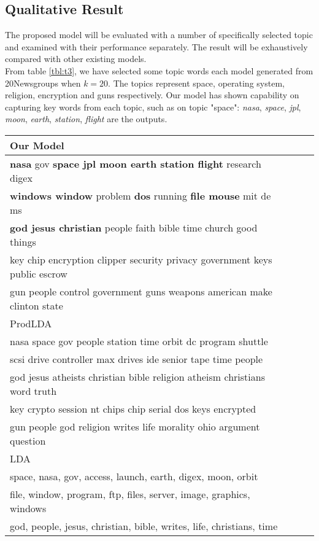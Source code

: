 \subsection{Qualitative Result}The proposed model will be evaluated with a number of specifically selected topic and examined with their performance separately. The result will be exhaustively compared with other existing models.\\
From table \ref{tbl:t3}, we have selected some topic words each model generated from 20Newsgroups when $ k=20 $. The topics represent space, operating system, religion, encryption and guns respectively. Our model has shown capability on capturing key words from each topic, such as on topic "space": \textit{nasa}, \textit{space}, \textit{jpl}, \textit{moon}, \textit{earth}, \textit{station}, \textit{flight} are the outputs.
\begin{table}[h]
\centering
\begin{tabular}{llll}
\hline
Our Model  \\ \hline
\textbf{nasa }gov \textbf{space jpl moon earth station flight }research digex\\
\textbf{windows window }problem \textbf{dos }running \textbf{file mouse }mit de ms\\
\textbf{god jesus christian }people faith bible time church good things\\
key chip encryption clipper security privacy government keys public escrow\\
gun people control government guns weapons american make clinton state \\ \hline
\hline
ProdLDA  \\ \hline
nasa space gov people station time orbit dc program shuttle \\
scsi drive controller max drives ide senior tape time people \\
god jesus atheists christian bible religion atheism christians word truth \\
key crypto session nt chips chip serial dos keys encrypted \\
gun people god religion writes life morality ohio argument question \\ \hline
\hline
LDA  \\ \hline
space, nasa, gov, access, launch, earth, digex, moon, orbit\\
file, window, program, ftp, files, server, image, graphics, windows\\
god, people, jesus, christian, bible, writes, life, christians, time\\

\end{tabular}
\end{table}
